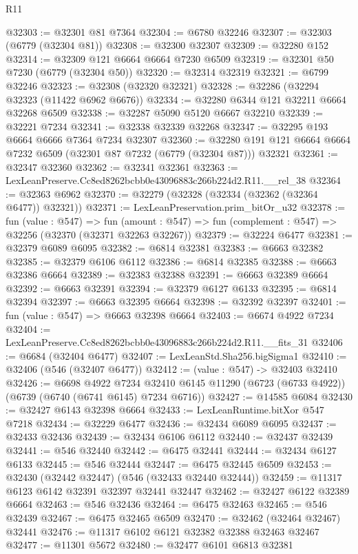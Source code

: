 \begin{lexlean}{R11}
\begin{coremodule}
@32303 := @32301 @81 @7364
@32304 := @6780 @32246
@32307 := @32303 (@6779 (@32304 @81))
@32308 := @32300 @32307
@32309 := @32280 @152
@32314 := @32309 @121 @6664 @6664 @7230 @6509
@32319 := @32301 @50 @7230 (@6779 (@32304 @50))
@32320 := @32314 @32319
@32321 := @6799 @32246
@32323 := @32308 (@32320 @32321)
@32328 := @32286 (@32294 @32323 (@11422 @6962 @6676))
@32334 := @32280 @6344 @121 @32211 @6664 @32268 @6509
@32338 := @32287 @5090 @5120 @6667 @32210
@32339 := @32221 @7234
@32341 := @32338 @32339 @32268
@32347 := @32295 @193 @6664 @6666 @7364 @7234 @32307
@32360 := @32280 @191 @121 @6664 @6664 @7232 @6509 (@32301 @87 @7232 (@6779 (@32304 @87))) @32321
@32361 := @32347 @32360
@32362 := @32341 @32361
@32363 := LexLeanPreserve.Cc8ed8262bcbb0e43096883c266b224d2.R11.__rel_38
@32364 := @32363 @6962
@32370 := @32279 (@32328 (@32334 (@32362 (@32364 @6477)) @32321))
@32371 := LexLeanPreservation.prim_bitOr_u32
@32378 := fun (value : @547) =>
  fun (amount : @547) => fun (complement : @547) => @32256 (@32370 (@32371 @32263 @32267))
@32379 := @32224 @6477
@32381 := @32379 @6089 @6095
@32382 := @6814 @32381
@32383 := @6663 @32382
@32385 := @32379 @6106 @6112
@32386 := @6814 @32385
@32388 := @6663 @32386 @6664
@32389 := @32383 @32388
@32391 := @6663 @32389 @6664
@32392 := @6663 @32391
@32394 := @32379 @6127 @6133
@32395 := @6814 @32394
@32397 := @6663 @32395 @6664
@32398 := @32392 @32397
@32401 := fun (value : @547) => @6663 @32398 @6664
@32403 := @6674 @4922 @7234
@32404 := LexLeanPreserve.Cc8ed8262bcbb0e43096883c266b224d2.R11.__fits_31
@32406 := @6684 (@32404 @6477)
@32407 := LexLeanStd.Sha256.bigSigma1
@32410 := @32406 (@546 (@32407 @6477))
@32412 := (value : @547) -> @32403 @32410
@32426 := @6698
    @4922
    @7234
    @32410
    @6145
    @11290
    (@6723 (@6733 @4922))
    (@6739 (@6740 (@6741 @6145) @7234 @6716))
@32427 := @14585 @6084
@32430 := @32427 @6143 @32398 @6664
@32433 := LexLeanRuntime.bitXor @547 @7218
@32434 := @32229 @6477
@32436 := @32434 @6089 @6095
@32437 := @32433 @32436
@32439 := @32434 @6106 @6112
@32440 := @32437 @32439
@32441 := @546 @32440
@32442 := @6475 @32441
@32444 := @32434 @6127 @6133
@32445 := @546 @32444
@32447 := @6475 @32445 @6509
@32453 := @32430 (@32442 @32447) (@546 (@32433 @32440 @32444))
@32459 := @11317 @6123 @6142 @32391 @32397 @32441 @32447
@32462 := @32427 @6122 @32389 @6664
@32463 := @546 @32436
@32464 := @6475 @32463
@32465 := @546 @32439
@32467 := @6475 @32465 @6509
@32470 := @32462 (@32464 @32467) @32441
@32476 := @11317 @6102 @6121 @32382 @32388 @32463 @32467
@32477 := @11301 @5672
@32480 := @32477 @6101 @6813 @32381

\end{coremodule}
\end{lexlean}

